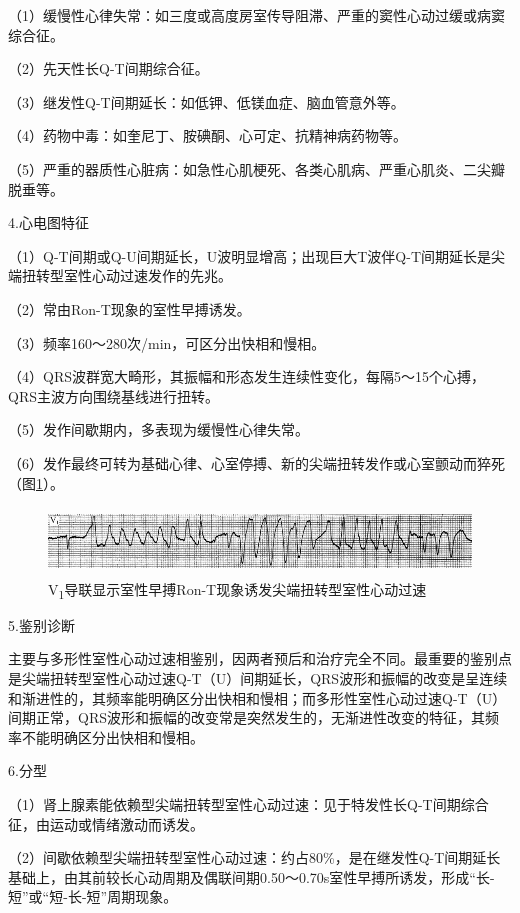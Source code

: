 （1）缓慢性心律失常：如三度或高度房室传导阻滞、严重的窦性心动过缓或病窦综合征。

（2）先天性长Q-T间期综合征。

（3）继发性Q-T间期延长：如低钾、低镁血症、脑血管意外等。

（4）药物中毒：如奎尼丁、胺碘酮、心可定、抗精神病药物等。

（5）严重的器质性心脏病：如急性心肌梗死、各类心肌病、严重心肌炎、二尖瓣脱垂等。

4.心电图特征

（1）Q-T间期或Q-U间期延长，U波明显增高；出现巨大T波伴Q-T间期延长是尖端扭转型室性心动过速发作的先兆。

（2）常由Ron-T现象的室性早搏诱发。

（3）频率160～280次/min，可区分出快相和慢相。

（4）QRS波群宽大畸形，其振幅和形态发生连续性变化，每隔5～15个心搏，QRS主波方向围绕基线进行扭转。

（5）发作间歇期内，多表现为缓慢性心律失常。

（6）发作最终可转为基础心律、心室停搏、新的尖端扭转发作或心室颤动而猝死（图\ref{fig39-11}）。

\begin{figure}[!htbp]
 \centering
 \includegraphics[width=5.58333in,height=0.70833in]{./images/Image00660.jpg}
 \captionsetup{justification=centering}
 \caption{V\textsubscript{1}导联显示室性早搏Ron-T现象诱发尖端扭转型室性心动过速}
 \label{fig39-11}
  \end{figure} 


5.鉴别诊断

主要与多形性室性心动过速相鉴别，因两者预后和治疗完全不同。最重要的鉴别点是尖端扭转型室性心动过速Q-T（U）间期延长，QRS波形和振幅的改变是呈连续和渐进性的，其频率能明确区分出快相和慢相；而多形性室性心动过速Q-T（U）间期正常，QRS波形和振幅的改变常是突然发生的，无渐进性改变的特征，其频率不能明确区分出快相和慢相。

6.分型

（1）肾上腺素能依赖型尖端扭转型室性心动过速：见于特发性长Q-T间期综合征，由运动或情绪激动而诱发。

（2）间歇依赖型尖端扭转型室性心动过速：约占80\%，是在继发性Q-T间期延长基础上，由其前较长心动周期及偶联间期0.50～0.70s室性早搏所诱发，形成“长-短”或“短-长-短”周期现象。

